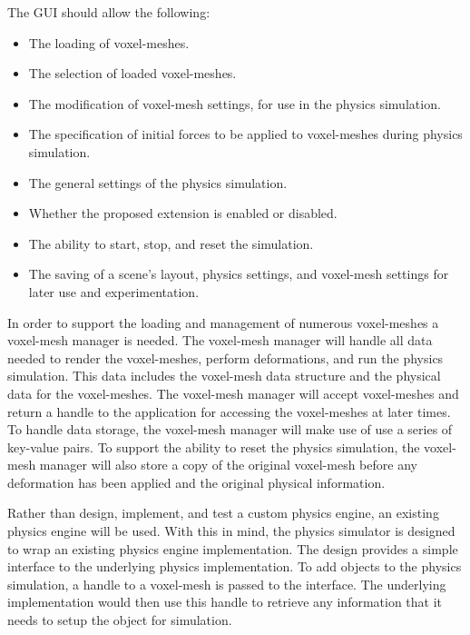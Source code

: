 The GUI should allow the following:

\begin{itemize}
  \item The loading of voxel-meshes.
  \item The selection of loaded voxel-meshes.
  \item The modification of voxel-mesh settings, for use in the physics simulation.
  \item The specification of initial forces to be applied to voxel-meshes during physics simulation.
  \item The general settings of the physics simulation.
  \item Whether the proposed extension is enabled or disabled.
  \item The ability to start, stop, and reset the simulation.
  \item The saving of a scene's layout, physics settings, and voxel-mesh settings for later use and
  experimentation.
\end{itemize}

In order to support the loading and management of numerous voxel-meshes a voxel-mesh manager is 
needed. The voxel-mesh manager will handle all data needed to render the voxel-meshes, perform
deformations, and run the physics simulation. This data includes the voxel-mesh data structure and
the physical data for the voxel-meshes. The voxel-mesh manager will accept voxel-meshes and return a 
handle to the application for accessing the voxel-meshes at later times. 
To handle data storage, the voxel-mesh manager will make use of use a series of key-value pairs. To 
support the ability to reset the physics simulation, the voxel-mesh manager will also store a
copy of the original voxel-mesh before any deformation has been applied and the original physical 
information.

Rather than design, implement, and test a custom physics engine, an existing physics engine will be
used. With this in mind, the physics simulator is designed to wrap an existing physics engine 
implementation. The design provides a simple interface to the underlying physics implementation. To 
add objects to the physics simulation, a handle to a voxel-mesh is passed to the interface. The 
underlying implementation would then use this handle to retrieve any information that it needs to 
setup the object for simulation. 
